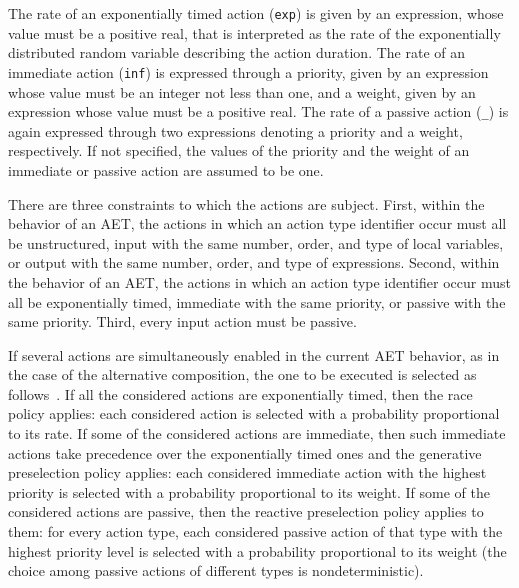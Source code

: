 The rate of an exponentially timed action ({\tt exp}) is given by an expression, whose value must be a
positive real, that is interpreted as the rate of the exponentially distributed random variable describing
the action duration. The rate of an immediate action ({\tt inf}) is expressed through a priority, given by
an expression whose value must be an integer not less than one, and a weight, given by an expression whose
value must be a positive real. The rate of a passive action ({\tt \_}) is again expressed through two
expressions denoting a priority and a weight, respectively. If not specified, the values of the priority and
the weight of an immediate or passive action are assumed to be one.

There are three constraints to which the actions are subject. First, within the behavior of an AET, the
actions in which an action type identifier occur must all be unstructured, input with the same number,
order, and type of local variables, or output with the same number, order, and type of expressions. Second,
within the behavior of an AET, the actions in which an action type identifier occur must all be
exponentially timed, immediate with the same priority, or passive with the same priority. Third, every input
action must be passive.

If several actions are simultaneously enabled in the current AET behavior, as in the case of the alternative
composition, the one to be executed is selected as follows~\cite{BB2}. If all the considered actions are
exponentially timed, then the race policy applies: each considered action is selected with a probability
proportional to its rate. If some of the considered actions are immediate, then such immediate actions take
precedence over the exponentially timed ones and the generative preselection policy applies: each considered
immediate action with the highest priority is selected with a probability proportional to its weight. If
some of the considered actions are passive, then the reactive preselection policy applies to them: for every
action type, each considered passive action of that type with the highest priority level is selected with a
probability proportional to its weight (the choice among passive actions of different types is
nondeterministic).

